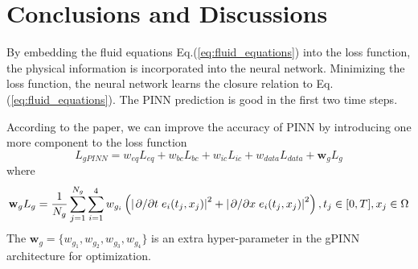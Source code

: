 \documentclass{article}
\begin{document}
    \section{Conclusions and Discussions}
    By embedding the fluid equations Eq.(\ref{eq:fluid_equations}) into the loss function, the physical information is incorporated into the neural network. Minimizing the loss function, the neural network learns the closure relation to Eq.(\ref{eq:fluid_equations}). The PINN prediction is good in the first two time steps.

    According to the paper, we can improve the accuracy of PINN by introducing one more component to the loss function
    \begin{equation} \label{eq:loss_funciton}
        L_{gPINN} = w_{eq}L_{eq} + w_{bc}L_{bc} + w_{ic}L_{ic} + w_{data}L_{data} + \mathbf{w}_gL_{g}
    \end{equation}
    where
    \begin{equation} \label{eq:loss_g}
        \mathbf{w}_gL_{g} = \frac{1}{N_{g}} \sum_{j=1}^{N_{g}}\sum_{i=1}^{4} w_{g_i}\left(\abs{\pdv*{t}e_i(t_j,x_j)}^2 + \abs{\pdv*{x}e_i(t_j,x_j)}^2\right), t_j\in[0,T], x_j\in\Omega
    \end{equation}
    The $\mathbf{w}_g = \{w_{g_1}, w_{g_2}, w_{g_3}, w_{g_4}\}$ is an extra hyper-parameter in the gPINN architecture for optimization.

    
    
\end{document}

